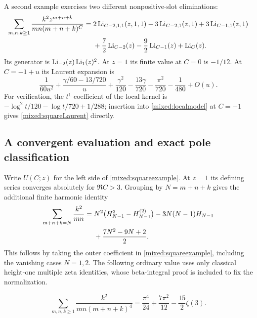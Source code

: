 A second example exercises two different nonpositive-slot eliminations:
\begin{align}\label{mixed:squareexample}
 \sum_{m,n,k\ge1}\frac{k^2z^{m+n+k}}{mn(m+n+k)^C}
 ={}&2\operatorname{Li}_{C-2,1,1}(z,1,1)
       -3\operatorname{Li}_{C-2,1}(z,1)+3\operatorname{Li}_{C-1,1}(z,1)\notag\\
 &+\frac72\operatorname{Li}_{C-2}(z)-\frac92\operatorname{Li}_{C-1}(z)+\operatorname{Li}_C(z).
\end{align}
Its generator is $\operatorname{Li}_{-2}(z)\operatorname{Li}_1(z)^2$. At $z=1$ its finite
value at $C=0$ is $-1/12$. At $C=-1+u$ its Laurent expansion is
\begin{equation}\label{mixed:squareLaurent}
 \frac1{60u^2}+\frac{\gamma/60-13/720}{u}
   +\frac{\gamma^2}{120}-\frac{13\gamma}{720}
    -\frac{\pi^2}{720}-\frac1{480}+O(u).
\end{equation}
For verification, the $t^1$ coefficient of the local kernel is
$-\log^2t/120-\log t/720+1/288$; insertion into
\eqref{mixed:localmodel} at $C=-1$ gives
\eqref{mixed:squareLaurent} directly.

\subsection{A convergent evaluation and exact pole classification}

Write $U(C;z)$ for the left side of \eqref{mixed:squareexample}.
At $z=1$ its defining series converges absolutely for $\Re C>3$.
Grouping by $N=m+n+k$ gives the additional finite harmonic identity
\begin{align}\label{mixed:Ucoeff}
 \sum_{m+n+k=N}\frac{k^2}{mn}
 ={}&N^2\bigl(H_{N-1}^2-H_{N-1}^{(2)}\bigr)
        -3N(N-1)H_{N-1}\notag\\
 &+\frac{7N^2-9N+2}{2}.
\end{align}
This follows by taking the outer coefficient in
\eqref{mixed:squareexample}, including the vanishing cases $N=1,2$.
The following ordinary value uses only classical height-one multiple
zeta identities, whose beta-integral proof is included to fix the
normalization.

\begin{corollary}
\label{mxex:weight-four}
\begin{equation}
 \boxed{\displaystyle
 \sum_{m,n,k\geq1}\frac{k^2}{mn(m+n+k)^4}
   =\frac{\pi^4}{24}+\frac{7\pi^2}{12}
      -\frac{15}{2}\zeta(3).}
 \label{mxex:convergent-value}
\end{equation}
\end{corollary}

